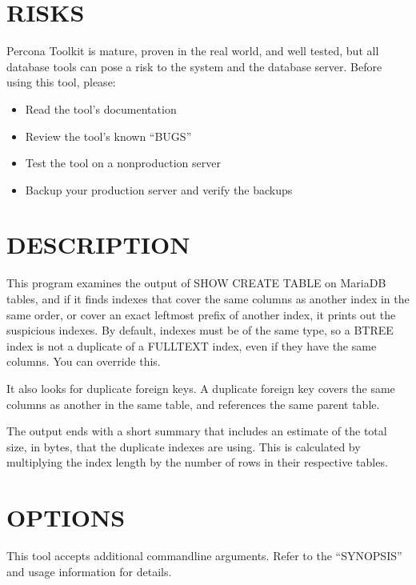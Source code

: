 \documentclass[letterpaper,10pt,english]{sphinxmanual}
\begin{document}
\section{RISKS}
\label{\detokenize{mariadb-index-checker:risks}}
\sphinxAtStartPar
Percona Toolkit is mature, proven in the real world, and well tested,
but all database tools can pose a risk to the system and the database
server.  Before using this tool, please:
\begin{itemize}
\item {} 
\sphinxAtStartPar
Read the tool’s documentation

\item {} 
\sphinxAtStartPar
Review the tool’s known “BUGS”

\item {} 
\sphinxAtStartPar
Test the tool on a non\sphinxhyphen{}production server

\item {} 
\sphinxAtStartPar
Backup your production server and verify the backups

\end{itemize}


\section{DESCRIPTION}
\label{\detokenize{mariadb-index-checker:description}}
\sphinxAtStartPar
This program examines the output of SHOW CREATE TABLE on MariaDB tables, and if
it finds indexes that cover the same columns as another index in the same
order, or cover an exact leftmost prefix of another index, it prints out
the suspicious indexes.  By default, indexes must be of the same type, so a
BTREE index is not a duplicate of a FULLTEXT index, even if they have the same
columns.  You can override this.

\sphinxAtStartPar
It also looks for duplicate foreign keys.  A duplicate foreign key covers the
same columns as another in the same table, and references the same parent
table.

\sphinxAtStartPar
The output ends with a short summary that includes an estimate of the total
size, in bytes, that the duplicate indexes are using. This is calculated by
multiplying the index length by the number of rows in their respective tables.


\section{OPTIONS}
\label{\detokenize{mariadb-index-checker:options}}
\sphinxAtStartPar
This tool accepts additional command\sphinxhyphen{}line arguments.  Refer to the
“SYNOPSIS” and usage information for details.
\end{document}
